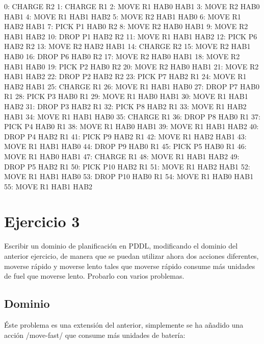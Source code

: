 \documentclass[	DIV=calc,%
							paper=a4,%
							fontsize=11pt]{scrartcl}	 					%
\newcommand{\miit}[1]{{\usefont{T1}{mdugm}{m}{it}\selectfont #1}}
\begin{document}
\begin{bashcode}
	        0: CHARGE R2
	        1: CHARGE R1
	        2: MOVE R1 HAB0 HAB1
	        3: MOVE R2 HAB0 HAB1
	        4: MOVE R1 HAB1 HAB2
	        5: MOVE R2 HAB1 HAB0
	        6: MOVE R1 HAB2 HAB1
	        7: PICK P1 HAB0 R2
	        8: MOVE R2 HAB0 HAB1
	        9: MOVE R2 HAB1 HAB2
	       10: DROP P1 HAB2 R2
	       11: MOVE R1 HAB1 HAB2
	       12: PICK P6 HAB2 R2
	       13: MOVE R2 HAB2 HAB1
	       14: CHARGE R2
	       15: MOVE R2 HAB1 HAB0
	       16: DROP P6 HAB0 R2
	       17: MOVE R2 HAB0 HAB1
	       18: MOVE R2 HAB1 HAB0
	       19: PICK P2 HAB0 R2
	       20: MOVE R2 HAB0 HAB1
	       21: MOVE R2 HAB1 HAB2
	       22: DROP P2 HAB2 R2
	       23: PICK P7 HAB2 R1
	       24: MOVE R1 HAB2 HAB1
	       25: CHARGE R1
	       26: MOVE R1 HAB1 HAB0
	       27: DROP P7 HAB0 R1
	       28: PICK P3 HAB0 R1
	       29: MOVE R1 HAB0 HAB1
	       30: MOVE R1 HAB1 HAB2
	       31: DROP P3 HAB2 R1
	       32: PICK P8 HAB2 R1
	       33: MOVE R1 HAB2 HAB1
	       34: MOVE R1 HAB1 HAB0
	       35: CHARGE R1
	       36: DROP P8 HAB0 R1
	       37: PICK P4 HAB0 R1
	       38: MOVE R1 HAB0 HAB1
	       39: MOVE R1 HAB1 HAB2
	       40: DROP P4 HAB2 R1
	       41: PICK P9 HAB2 R1
	       42: MOVE R1 HAB2 HAB1
	       43: MOVE R1 HAB1 HAB0
	       44: DROP P9 HAB0 R1
	       45: PICK P5 HAB0 R1
	       46: MOVE R1 HAB0 HAB1
	       47: CHARGE R1
	       48: MOVE R1 HAB1 HAB2
	       49: DROP P5 HAB2 R1
	       50: PICK P10 HAB2 R1
	       51: MOVE R1 HAB2 HAB1
	       52: MOVE R1 HAB1 HAB0
	       53: DROP P10 HAB0 R1
	       54: MOVE R1 HAB0 HAB1
	       55: MOVE R1 HAB1 HAB2
\end{bashcode}

\section{Ejercicio 3}
\label{sec:Ejercicio 3}

\miit{Escribir un dominio de planificación en PDDL, modificando el dominio del anterior
ejercicio, de manera que se puedan utilizar ahora dos acciones diferentes, moverse
rápido y moverse lento tales que moverse rápido consume más unidades de fuel que
moverse lento. Probarlo con varios problemas.}

\subsection{Dominio}
\label{sub:Dominio}

Éste problema es una extensión del anterior, simplemente se ha añadido una acción \newlispinline/move-fast/ que consume más unidades de batería:
\end{document}
